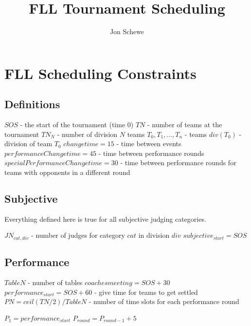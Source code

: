 \documentclass[letterpaper,11pt]{report}
\title{FLL Tournament Scheduling}
\author{Jon Schewe}
\begin{document}
\maketitle

\chapter{FLL Scheduling Constraints}

\section{Definitions}

\begin{algorithmic}
\STATE $SOS$ - the start of the tournament (time 0)
\STATE $TN$ - number of teams at the tournament
\STATE $TN_{N}$ - number of division $N$ teams
\STATE $T_{0}, T_{1}, \dots, T_{n}$ - teams
\STATE $div(T_{0})$ - division of team $T_{0}$
\STATE $changetime = 15$ - time between events
\STATE $performanceChangetime = 45$ - time between performance rounds
\STATE $specialPerformanceChangetime = 30$ - time between performance
rounds for teams with opponents in a different round
\end{algorithmic}


\section{Subjective}

Everything defined here is true for all subjective judging categories.

\begin{algorithmic}
\STATE $JN_{cat,div}$ - number of judges for category $cat$ in division $div$
\STATE $subjective_{start} = SOS$
\end{algorithmic}

\section{Performance}
\begin{algorithmic}
\STATE $TableN$ - number of tables
\STATE $coaches meeting = SOS + 30$
\STATE $performance_{start} = SOS + 60$ - give time for teams to get settled
\STATE $PN = ceil(TN / 2) / TableN$ - number of time slots for each performance round
\end{algorithmic}

\begin{algorithmic}
\STATE $P_{1} = performance_{start}$
  \STATE $P_{round} = P_{round-1} + 5$
\ENDFOR
\end{algorithmic}
\end{document}

